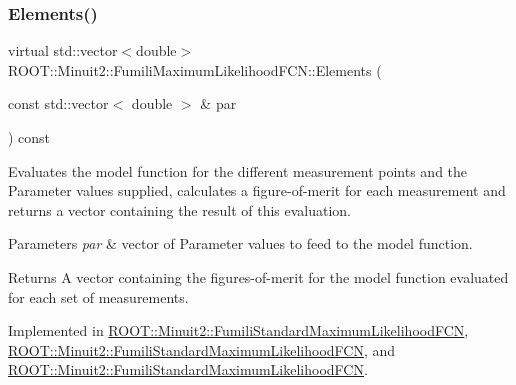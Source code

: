 \subsubsection{\texorpdfstring{Elements()}{Elements()}\hspace{0.1cm}{\footnotesize\ttfamily [2/3]}}
{\footnotesize\ttfamily virtual std\+::vector$<$double$>$ R\+O\+O\+T\+::\+Minuit2\+::\+Fumili\+Maximum\+Likelihood\+F\+C\+N\+::\+Elements (\begin{DoxyParamCaption}\item[{const std\+::vector$<$ double $>$ \&}]{par }\end{DoxyParamCaption}) const\hspace{0.3cm}{\ttfamily [pure virtual]}}

Evaluates the model function for the different measurement points and the Parameter values supplied, calculates a figure-\/of-\/merit for each measurement and returns a vector containing the result of this evaluation.


\begin{DoxyParams}{Parameters}
{\em par} & vector of Parameter values to feed to the model function.\\
\hline
\end{DoxyParams}
\begin{DoxyReturn}{Returns}
A vector containing the figures-\/of-\/merit for the model function evaluated for each set of measurements. 
\end{DoxyReturn}


Implemented in \mbox{\hyperlink{classROOT_1_1Minuit2_1_1FumiliStandardMaximumLikelihoodFCN_a19866fac44787dee8e2a6a35e7a15fe1}{R\+O\+O\+T\+::\+Minuit2\+::\+Fumili\+Standard\+Maximum\+Likelihood\+F\+CN}}, \mbox{\hyperlink{classROOT_1_1Minuit2_1_1FumiliStandardMaximumLikelihoodFCN_af104474f9095c245b467f9db554a126a}{R\+O\+O\+T\+::\+Minuit2\+::\+Fumili\+Standard\+Maximum\+Likelihood\+F\+CN}}, and \mbox{\hyperlink{classROOT_1_1Minuit2_1_1FumiliStandardMaximumLikelihoodFCN_af104474f9095c245b467f9db554a126a}{R\+O\+O\+T\+::\+Minuit2\+::\+Fumili\+Standard\+Maximum\+Likelihood\+F\+CN}}.

\mbox{\label{classROOT_1_1Minuit2_1_1FumiliMaximumLikelihoodFCN_a20aa81dc23ba61ed49ba78f4f9627e59}} 
